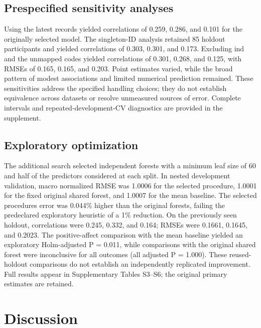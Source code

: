 \documentclass[11pt,letterpaper]{article}
\begin{document}
\subsection{Prespecified sensitivity analyses}\label{prespecified-sensitivity-analyses}

Using the latest records yielded correlations of 0.259, 0.286, and 0.101 for the originally selected model. The singleton-ID analysis retained 85 holdout participants and yielded correlations of 0.303, 0.301, and 0.173. Excluding ind and the unmapped codes yielded correlations of 0.301, 0.268, and 0.125, with RMSEs of 0.165, 0.165, and 0.203. Point estimates varied, while the broad pattern of modest associations and limited numerical prediction remained. These sensitivities address the specified handling choices; they do not establish equivalence across datasets or resolve unmeasured sources of error. Complete intervals and repeated-development-CV diagnostics are provided in the supplement.

\subsection{Exploratory optimization}\label{exploratory-optimization}

The additional search selected independent forests with a minimum leaf size of 60 and half of the predictors considered at each split. In nested development validation, macro normalized RMSE was 1.0006 for the selected procedure, 1.0001 for the fixed original shared forest, and 1.0007 for the mean baseline. The selected procedure\textquotesingle s error was 0.044\% higher than the original forest\textquotesingle s, failing the predeclared exploratory heuristic of a 1\% reduction. On the previously seen holdout, correlations were 0.245, 0.332, and 0.164; RMSEs were 0.1661, 0.1645, and 0.2023. The positive-affect comparison with the mean baseline yielded an exploratory Holm-adjusted P = 0.011, while comparisons with the original shared forest were inconclusive for all outcomes (all adjusted P = 1.000). These reused-holdout comparisons do not establish an independently replicated improvement. Full results appear in Supplementary Tables S3--S6; the original primary estimates are retained.

\FloatBarrier

\section{Discussion}\label{discussion}
\end{document}
